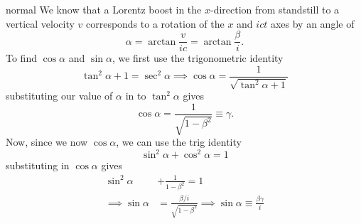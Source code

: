 \begin{solution}{normal}
We know that a Lorentz boost in the $x$-direction from standstill to a vertical velocity $v$ corresponds to a rotation of the $x$ and $ict$ axes by an angle of 
\[\alpha = \arctan\frac{v}{ic} = \arctan\frac{\beta}{i}.\]
To find $\cos\alpha$ and $\sin\alpha$, we first use the trigonometric identity
\[\tan^2\alpha + 1 = \sec^2\alpha \implies \cos\alpha = \frac{1}{\sqrt{\tan^2\alpha + 1}}\]
substituting our value of $\alpha$ in to $\tan^2\alpha$ gives 
\[\cos\alpha = \frac{1}{\sqrt{1 - \beta^2}} \equiv \gamma.\]
Now, since we now $\cos\alpha$, we can use the trig identity
\[\sin^2\alpha + \cos^2\alpha = 1\]
substituting in $\cos\alpha$ gives 
\begin{align*}
\sin^2\alpha &+ \frac{1}{1-\beta^2} = 1\\
\implies \sin\alpha &= \frac{\beta/i}{\sqrt{1-\beta^2}}\implies \sin\alpha\equiv \frac{\beta\gamma}{i}
\end{align*}
\end{solution}